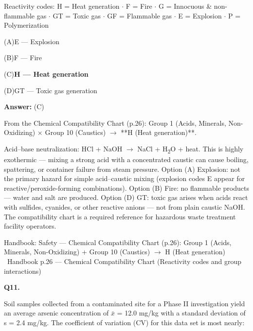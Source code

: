 \documentclass[11pt]{article}
\newcommand{\correct}[1]{\textbf{#1}\;{\color{accent}$\checkmark$}}
\newcommand{\optline}[2]{\par\noindent\hspace{1.2em}(#1)\hspace{0.6em}#2}
\begin{document}
Reactivity codes: H = Heat generation $\cdot$ F = Fire $\cdot$ G = Innocuous \& non-flammable gas $\cdot$ GT = Toxic gas $\cdot$ GF = Flammable gas $\cdot$ E = Explosion $\cdot$ P = Polymerization\par\vspace{3pt}
\optline{A}{E --- Explosion}
\optline{B}{F --- Fire}
\optline{C}{\correct{H --- Heat generation}}
\optline{D}{GT --- Toxic gas generation}
\par\vspace{3pt}
\vspace{2pt}\par\noindent\colorbox{boxbg}{\parbox{\dimexpr\linewidth-2\fboxsep\relax}{%
\vspace{2pt}\textbf{Answer:} (C)\par\vspace{2pt}
{\small From the Chemical Compatibility Chart (p.26): Group 1 (Acids, Minerals, Non-Oxidizing) $\times$ Group 10 (Caustics) $\rightarrow$ **H (Heat generation)**.

Acid--base neutralization: HCl + NaOH $\rightarrow$ NaCl + H\textsubscript{2}O + heat. This is highly exothermic --- mixing a strong acid with a concentrated caustic can cause boiling, spattering, or container failure from steam pressure. Option (A) Explosion: not the primary hazard for simple acid--caustic mixing (explosion codes E appear for reactive/peroxide-forming combinations). Option (B) Fire: no flammable products --- water and salt are produced. Option (D) GT: toxic gas arises when acids react with sulfides, cyanides, or other reactive anions --- not from plain caustic NaOH. The compatibility chart is a required reference for hazardous waste treatment facility operators.}\par\vspace{2pt}
{\footnotesize\color{soft}Handbook: Safety --- Chemical Compatibility Chart (p.26): Group 1 (Acids, Minerals, Non-Oxidizing) + Group 10 (Caustics) $\rightarrow$ H (Heat generation) \textbullet\ Handbook p.26 --- Chemical Compatibility Chart (Reactivity codes and group interactions)}\vspace{2pt}
}}
\vspace{9pt}
\filbreak
\textbf{\color{accent}Q11.}\par\vspace{2pt}
Soil samples collected from a contaminated site for a Phase II investigation yield an average arsenic concentration of $\bar{x}$ = 12.0 mg/kg with a standard deviation of s = 2.4 mg/kg. The coefficient of variation (CV) for this data set is most nearly:
\end{document}
